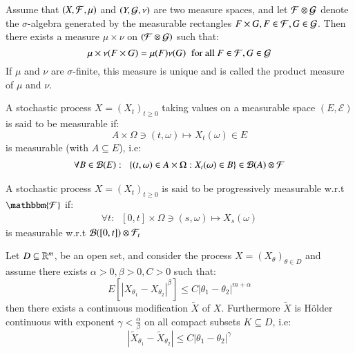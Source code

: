 \begin{theorem}
Assume that $(X, \mathcal{F}, \mu)$ and $(Y, \mathcal{G}, \nu)$ are two measure spaces, and let $\mathcal{F}\otimes \mathcal{G}$ denote the $\sigma$-algebra generated by the measurable rectangles $F\times G, F \in \mathcal{F}, G\in \mathcal{G}$. Then there exists a measure $\mu\times \nu$ on $(\mathcal{F}\otimes \mathcal{G})$ such that: 
\[
\mu\times\nu(F\times G) = \mu(F)\nu(G)\;\;\text{for all $F\in \mathcal{F}, G \in \mathcal{G}$}
\]
If $\mu$ and $\nu$ are $\sigma$-finite, this measure is unique and is called the product measure of $\mu$ and $\nu$. 
\end{theorem}

\begin{definition}
A stochastic process $X = (X_{t})_{t\geq 0}$ taking values on a measurable space $(E, \mathcal{E})$ is said to be measurable if:
\[
A\times \Omega \ni (t,\omega) \mapsto X_{t}(\omega) \in E
\]
is measurable (with $A\subseteq E$), i.e:
\begin{align*}
\forall B \in \mathcal{B}(E): \;\; 
\{
(t,\omega) \in A \times \Omega: X_{t}(\omega) \in B
\} \in \mathcal{B}(A) \otimes \mathcal{F}
\end{align*}
\end{definition}

\begin{definition}
A stochastic process $X = (X_{t})_{t\geq 0}$ is said to be progressively measurable w.r.t $\mathbbm{\F}$ if:
\begin{align*}
\forall t:\;\; 
[0,t]\times \Omega \ni (s,\omega) \mapsto X_{s}(\omega)
\end{align*}
is measurable w.r.t $\mathcal{B}([0,t])\otimes \mathcal{F}_{t}$
\end{definition}


\begin{theorem}
Let $D\subseteq \mathbb{R}^{m}$, be an open set, and consider the process $X = (X_{\theta})_{\theta \in D}$ and assume there exists $\alpha >0, \beta>0, C>0$ such that:
\[E[|X_{\theta_{1}} - X_{\theta_{2}}|^{\beta}] \leq C|\theta_{1}-\theta_{2}|^{m + \alpha}
\]
then there exists a continuous modification $\widetilde{X}$ of $X$. Furthermore $\widetilde{X}$ is Hölder continuous with exponent $\gamma < \frac{\alpha}{\beta}$ on all compact subsets $K\subseteq D$, i.e: 
\[|\widetilde{X}_{\theta_{1}} -\widetilde{X}_{\theta_{2}}| \leq C|\theta_{1}-\theta_{2}|^{\gamma}
\]
\end{theorem}

